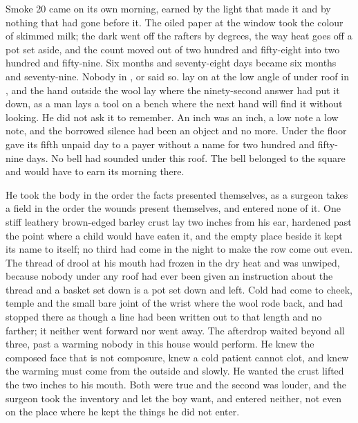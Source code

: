 
Smoke 20 came on its own morning, earned by the light that made it and by nothing that had gone before it. The oiled paper at the window took the colour of skimmed milk; the dark went off the rafters by degrees, the way heat goes off a pot set aside, and the count moved out of two hundred and fifty-eight into two hundred and fifty-nine. Six months and seventy-eight days became six months and seventy-nine. Nobody in ,  or  said so.  lay on  at the low angle of  under  roof in , and the hand outside the wool lay where the ninety-second answer had put it down, as a man lays a tool on a bench where the next hand will find it without looking. He did not ask it to remember. An inch was an inch, a low note a low note, and the borrowed silence had been an object and no more. Under the floor  gave its fifth unpaid day to a payer without a name for two hundred and fifty-nine days. No bell had sounded under this roof. The bell belonged to the square and would have to earn its morning there.

He took the body in the order the facts presented themselves, as a surgeon takes a field in the order the wounds present themselves, and entered none of it. One stiff leathery brown-edged barley crust lay two inches from his ear, hardened past the point where a child would have eaten it, and the empty place beside it kept its name to itself; no third had come in the night to make the row come out even. The thread of drool at his mouth had frozen in the dry heat and was unwiped, because nobody under any roof had ever been given an instruction about the thread and a basket set down is a pot set down and left. Cold had come to cheek, temple and the small bare joint of the wrist where the wool rode back, and had stopped there as though a line had been written out to that length and no farther; it neither went forward nor went away. The afterdrop waited beyond all three, past a warming nobody in this house would perform. He knew the composed face that is not composure, knew a cold patient cannot clot, and knew the warming must come from the outside and slowly. He wanted the crust lifted the two inches to his mouth. Both were true and the second was louder, and the surgeon took the inventory and let the boy want, and entered neither, not even on the place where he kept the things he did not enter.

